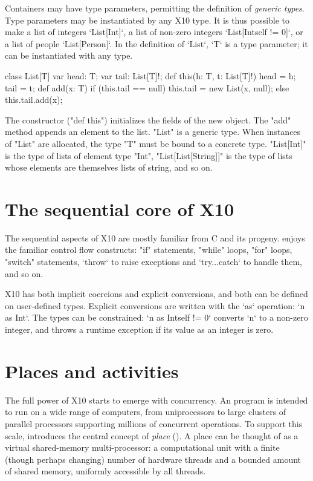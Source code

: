 Containers may have type parameters, permitting the definition of
{\em generic types}.  Type parameters may be instantiated by any X10 type.  It
is thus possible to make a list of integers \xcd`List[Int]`, a list of
non-zero integers \xcd`List[Int{self != 0}]`, or a list of people
\xcd`List[Person]`.  In the definition of \xcd`List`, \xcd`T` is a type
parameter; it can be instantiated with any type.
\begin{xten}
class List[T] {
    var head: T;
    var tail: List[T]!;
    def this(h: T, t: List[T]!) { head = h; tail = t; }
    def add(x: T) {
        if (this.tail == null)
            this.tail = new List(x, null);
        else
            this.tail.add(x);
    }
}
\end{xten}
The constructor (\xcd"def this") initializes the fields of the new object.
The \xcd"add" method appends an element to the list.
\xcd"List" is a generic type.  When  instances of \xcd"List" are
allocated, the type \param{} \xcd"T" must be bound to a concrete
type.  \xcd"List[Int]" is the type of lists of element type
\xcd"Int", \xcd"List[List[String]]" is the type of lists whose elements are
themselves lists of string, and so on.


\section{The sequential core of X10}

The sequential aspects of X10 are mostly familiar from C and its progeny.
\Xten{} enjoys the familiar control flow constructs: \xcd"if" statements,
\xcd"while" loops, \xcd"for" loops, \xcd"switch" statements, \xcd`throw` to
raise exceptions and \xcd`try...catch` to handle them, and so on.

X10 has both implicit coercions and explicit conversions, and both can be
defined on user-defined types.  Explicit conversions are written with the
\xcd`as` operation: \xcd`n as Int`.  The types can be constrained: 
\xcd`n as Int{self != 0}` converts \xcd`n` to a non-zero integer, and throws a
runtime exception if its value as an integer is zero.

\section{Places and activities}

The full power of X10 starts to emerge with concurrency.
An \Xten{} program is intended to run on a wide range of computers,
from uniprocessors to large clusters of parallel processors supporting
millions of concurrent operations. To support this scale, \Xten{}
introduces the central concept of \emph{place} ().
A place can be thought of as a virtual shared-memory multi-processor:
a computational unit with a finite (though perhaps changing) number of
hardware threads and a bounded amount of shared memory, uniformly
accessible by all threads.


